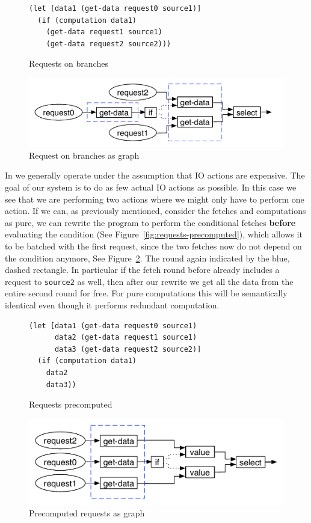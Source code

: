 \begin{figure}
\begin{verbatim}
(let [data1 (get-data request0 source1)]
  (if (computation data1)
    (get-data request1 source1)
    (get-data request2 source2)))
\end{verbatim}
\caption{Requests on branches}
\label{fig:requests-on-branches}
\includegraphics[width=\textwidth]{../Figures/requests-on-branches-graph}
\caption{Request on branches as graph}
\label{fig:requests-on-branches-graph}
\end{figure}

In \yauhau{} we generally operate under the assumption that IO actions are expensive.
The goal of our system is to do as few actual IO actions as possible.
In this case we see that we are performing two actions where we might only have to perform one action.
If we can, as previously mentioned, consider the fetches and computations as pure, we can rewrite the program to perform the conditional fetches \textbf{before} evaluating the condition (See Figure~\ref{fig:requests-precomputed}), which allows it to be batched with the first request, since the two fetches now do not depend on the condition anymore, See Figure~\ref{fig:requests-precomputed-graph}.
The round again indicated by the blue, dashed rectangle.
In particular if the fetch round before already includes a request to \texttt{source2} as well, then after our rewrite we get all the data from the entire second round for free.
For pure computations this will be semantically identical even though it performs redundant computation.

\begin{figure}
\begin{verbatim}
(let [data1 (get-data request0 source1)
      data2 (get-data request1 source1)
      data3 (get-data request2 source2)]
  (if (computation data1)
    data2
    data3))
\end{verbatim}
\caption{Requests precomputed}
\label{fig:requests-precomputed}
\includegraphics[width=\textwidth]{../Figures/requests-precomputed-graph}
\caption{Precomputed requests as graph}
\label{fig:requests-precomputed-graph}
\end{figure}

